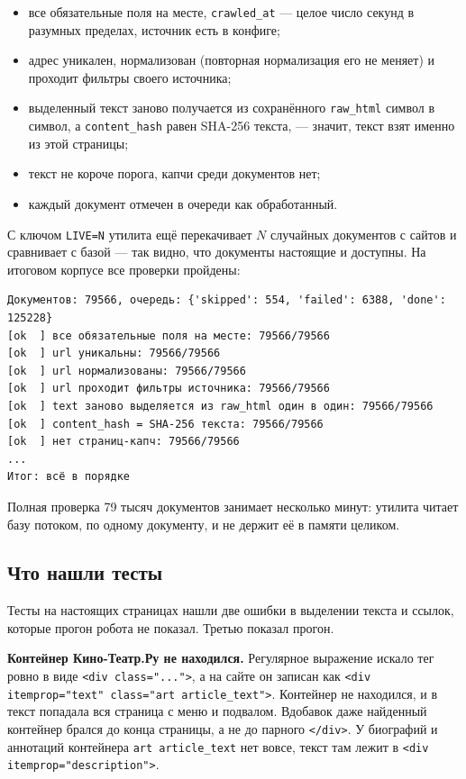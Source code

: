 \begin{itemize}
    \item все обязательные поля на месте, \texttt{crawled\_at} --- целое число
          секунд в разумных пределах, источник есть в конфиге;
    \item адрес уникален, нормализован (повторная нормализация его не меняет)
          и проходит фильтры своего источника;
    \item выделенный текст заново получается из сохранённого \texttt{raw\_html}
          символ в символ, а \texttt{content\_hash} равен SHA-256 текста, ---
          значит, текст взят именно из этой страницы;
    \item текст не короче порога, капчи среди документов нет;
    \item каждый документ отмечен в очереди как обработанный.
\end{itemize}

С ключом \texttt{LIVE=N} утилита ещё перекачивает $N$ случайных документов с
сайтов и сравнивает с базой --- так видно, что документы настоящие и доступны.
На итоговом корпусе все проверки пройдены:

\begin{verbatim}
Документов: 79566, очередь: {'skipped': 554, 'failed': 6388, 'done': 125228}
[ok  ] все обязательные поля на месте: 79566/79566
[ok  ] url уникальны: 79566/79566
[ok  ] url нормализованы: 79566/79566
[ok  ] url проходит фильтры источника: 79566/79566
[ok  ] text заново выделяется из raw_html один в один: 79566/79566
[ok  ] content_hash = SHA-256 текста: 79566/79566
[ok  ] нет страниц-капч: 79566/79566
...
Итог: всё в порядке
\end{verbatim}

Полная проверка 79 тысяч документов занимает несколько минут: утилита читает
базу потоком, по одному документу, и не держит её в памяти целиком.

\subsection*{Что нашли тесты}

Тесты на настоящих страницах нашли две ошибки в выделении текста и ссылок,
которые прогон робота не показал. Третью показал прогон.

\textbf{Контейнер Кино-Театр.Ру не находился.} Регулярное выражение искало тег
ровно в виде \texttt{<div class="...">}, а на сайте он записан как
\texttt{<div itemprop="text" class="art article\_text">}. Контейнер не
находился, и в текст попадала вся страница с меню и подвалом. Вдобавок даже
найденный контейнер брался до конца страницы, а не до парного
\texttt{</div>}. У биографий и аннотаций контейнера \texttt{art article\_text}
нет вовсе, текст там лежит в \texttt{<div itemprop="description">}.


